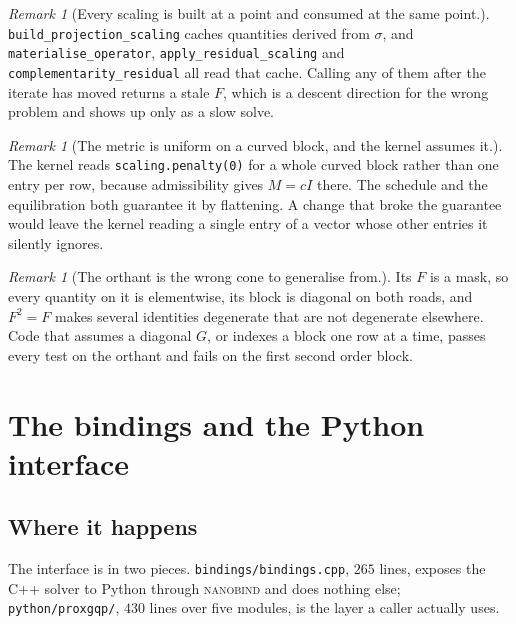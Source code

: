 \documentclass[a4paper,11pt]{book}
\theoremstyle{plain}
\theoremstyle{definition}
\theoremstyle{remark}
\newtheorem{remark}[theorem]{Remark}
\numberwithin{equation}{chapter}
\numberwithin{algorithm}{chapter}
\begin{document}
	\begin{remark}[Every scaling is built at a point and consumed at the same
		point.] \texttt{build\_projection\_scaling} caches quantities derived from
		$\sigma$, and \texttt{materialise\_operator},
		\texttt{apply\_residual\_scaling} and \texttt{complementarity\_residual}
		all read that cache. Calling any of them after the iterate has moved
		returns a stale $F$, which is a descent direction for the wrong problem and
		shows up only as a slow solve.
	\end{remark}

	\begin{remark}[The metric is uniform on a curved block, and the kernel assumes
		it.] The kernel reads \texttt{scaling.penalty(0)} for a whole curved block
		rather than one entry per row, because admissibility gives $M=cI$ there.
		The schedule and the equilibration both guarantee it by flattening. A
		change that broke the guarantee would leave the kernel reading a single
		entry of a vector whose other entries it silently ignores.
	\end{remark}

	\begin{remark}[The orthant is the wrong cone to generalise from.]
		Its $F$ is a mask, so every quantity on it is elementwise, its block is
		diagonal on both roads, and $F^2=F$ makes several identities degenerate
		that are not degenerate elsewhere. Code that assumes a diagonal $G$, or
		indexes a block one row at a time, passes every test on the orthant and
		fails on the first second order block.
	\end{remark}

	\chapter{The bindings and the Python interface}

	\section{Where it happens}

	The interface is in two pieces. \texttt{bindings/bindings.cpp}, $265$ lines,
	exposes the C++ solver to Python through \textsc{nanobind} and does nothing
	else; \texttt{python/proxgqp/}, $430$ lines over five modules, is the layer a
	caller actually uses.
\end{document}
